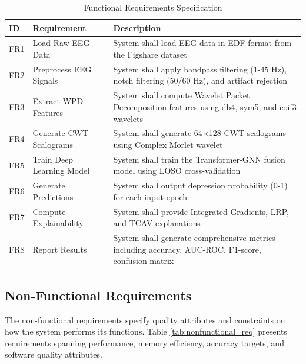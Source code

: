 \begin{table}[H]
    \centering
    \small
    \caption{Functional Requirements Specification}
    \label{tab:functional_req}
    \begin{tabularx}{\textwidth}{|L{1.2cm}|L{3.5cm}|X|}
        \hline
        \textbf{ID} & \textbf{Requirement} & \textbf{Description} \\
        \hline
        FR1 & Load Raw EEG Data & System shall load EEG data in EDF format from the Figshare dataset \\
        \hline
        FR2 & Preprocess EEG Signals & System shall apply bandpass filtering (1-45 Hz), notch filtering (50/60 Hz), and artifact rejection \\
        \hline
        FR3 & Extract WPD Features & System shall compute Wavelet Packet Decomposition features using db4, sym5, and coif3 wavelets \\
        \hline
        FR4 & Generate CWT Scalograms & System shall generate 64$\times$128 CWT scalograms using Complex Morlet wavelet \\
        \hline
        FR5 & Train Deep Learning Model & System shall train the Transformer-GNN fusion model using LOSO cross-validation \\
        \hline
        FR6 & Generate Predictions & System shall output depression probability (0-1) for each input epoch \\
        \hline
        FR7 & Compute Explainability & System shall provide Integrated Gradients, LRP, and TCAV explanations \\
        \hline
        FR8 & Report Results & System shall generate comprehensive metrics including accuracy, AUC-ROC, F1-score, confusion matrix \\
        \hline
    \end{tabularx}
\end{table}

\subsection{Non-Functional Requirements}

The non-functional requirements specify quality attributes and constraints on how the system performs its functions. Table \ref{tab:nonfunctional_req} presents requirements spanning performance, memory efficiency, accuracy targets, and software quality attributes.

